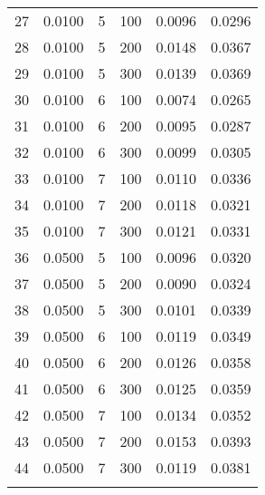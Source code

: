 \begin{center}
\begin{tabular}{cccccc}
    27 & 0.0100 & 5 & 100 & 0.0096 & 0.0296 \\
    28 & 0.0100 & 5 & 200 & 0.0148 & 0.0367 \\
    29 & 0.0100 & 5 & 300 & 0.0139 & 0.0369 \\
    30 & 0.0100 & 6 & 100 & 0.0074 & 0.0265 \\
    31 & 0.0100 & 6 & 200 & 0.0095 & 0.0287 \\
    32 & 0.0100 & 6 & 300 & 0.0099 & 0.0305 \\
    33 & 0.0100 & 7 & 100 & 0.0110 & 0.0336 \\
    34 & 0.0100 & 7 & 200 & 0.0118 & 0.0321 \\
    35 & 0.0100 & 7 & 300 & 0.0121 & 0.0331 \\
    36 & 0.0500 & 5 & 100 & 0.0096 & 0.0320 \\
    37 & 0.0500 & 5 & 200 & 0.0090 & 0.0324 \\
    38 & 0.0500 & 5 & 300 & 0.0101 & 0.0339 \\
    39 & 0.0500 & 6 & 100 & 0.0119 & 0.0349 \\
    40 & 0.0500 & 6 & 200 & 0.0126 & 0.0358 \\
    41 & 0.0500 & 6 & 300 & 0.0125 & 0.0359 \\
    42 & 0.0500 & 7 & 100 & 0.0134 & 0.0352 \\
    43 & 0.0500 & 7 & 200 & 0.0153 & 0.0393 \\
    44 & 0.0500 & 7 & 300 & 0.0119 & 0.0381 \\
    \hline
    \label{tab:hyperparameter_tuning}
    \end{tabular}
\end{center}